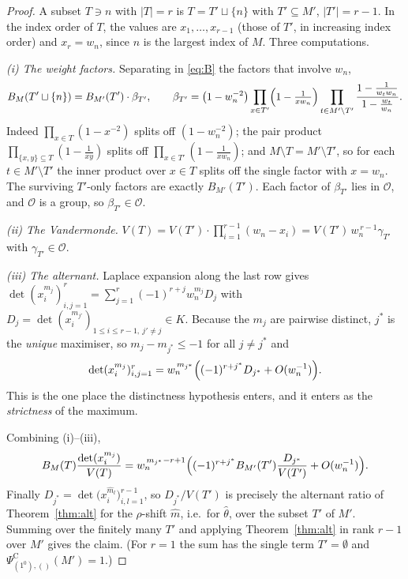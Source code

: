 \documentclass[11pt]{article}
\theoremstyle{definition}
\newcommand{\PsiC}{\Psi^{\mathrm{C}}}
\begin{document}
\begin{proof}
A subset $T\ni n$ with $|T|=r$ is $T=T'\sqcup\{n\}$ with $T'\subseteq M'$, $|T'|=r-1$. In
the index order of $T$, the values are $x_1,\dots,x_{r-1}$ (those of $T'$, in increasing
index order) and $x_r=w_n$, since $n$ is the largest index of $M$. Three computations.

\emph{(i) The weight factors.} Separating in \eqref{eq:B} the factors that involve $w_n$,
\[
  B_M(T'\sqcup\{n\})=B_{M'}(T')\cdot\beta_{T'},\qquad
  \beta_{T'}=\bigl(1-w_n^{-2}\bigr)\prod_{x\in T'}\Bigl(1-\tfrac{1}{xw_n}\Bigr)
  \prod_{t\in M'\setminus T'}\frac{1-\frac{1}{w_tw_n}}{1-\frac{w_t}{w_n}} .
\]
Indeed $\prod_{x\in T}(1-x^{-2})$ splits off $(1-w_n^{-2})$; the pair product
$\prod_{\{x,y\}\subseteq T}(1-\frac{1}{xy})$ splits off
$\prod_{x\in T'}(1-\frac{1}{xw_n})$; and $M\setminus T=M'\setminus T'$, so for each
$t\in M'\setminus T'$ the inner product over $x\in T$ splits off the single factor with
$x=w_n$. The surviving $T'$-only factors are exactly $B_{M'}(T')$. Each factor of
$\beta_{T'}$ lies in $\mathcal{O}$, and $\mathcal{O}$ is a group, so
$\beta_{T'}\in\mathcal{O}$.

\emph{(ii) The Vandermonde.} $V(T)=V(T')\cdot\prod_{i=1}^{r-1}(w_n-x_i)
= V(T')\,w_n^{\,r-1}\gamma_{T'}$ with $\gamma_{T'}\in\mathcal{O}$.

\emph{(iii) The alternant.} Laplace expansion along the last row gives
$\det(x_i^{m_j})_{i,j=1}^{r}=\sum_{j=1}^{r}(-1)^{r+j}w_n^{m_j}D_j$ with
$D_j=\det(x_i^{m_{j'}})_{1\le i\le r-1,\ j'\ne j}\in K$. Because the $m_j$ are pairwise
distinct, $j^\ast$ is the \emph{unique} maximiser, so $m_j-m_{j^\ast}\le-1$ for all
$j\ne j^\ast$ and
\[
  \det(x_i^{m_j})_{i,j=1}^{r}
  = w_n^{\,m_{j^\ast}}\Bigl((-1)^{r+j^\ast}D_{j^\ast}+O(w_n^{-1})\Bigr).
\]
This is the one place the distinctness hypothesis enters, and it enters as the
\emph{strictness} of the maximum.

Combining (i)--(iii),
\[
  B_M(T)\frac{\det(x_i^{m_j})}{V(T)}
  = w_n^{\,m_{j^\ast}-r+1}
    \Bigl((-1)^{r+j^\ast}B_{M'}(T')\frac{D_{j^\ast}}{V(T')}+O(w_n^{-1})\Bigr).
\]
Finally $D_{j^\ast}=\det\bigl(x_i^{\hat m_l}\bigr)_{i,l=1}^{r-1}$, so
$D_{j^\ast}/V(T')$ is precisely the alternant ratio of Theorem~\ref{thm:alt} for the
$\rho$-shift $\hat m$, i.e.\ for $\hat\theta$, over the subset $T'$ of $M'$. Summing over
the finitely many $T'$ and applying Theorem~\ref{thm:alt} in rank $r-1$ over $M'$ gives the
claim. (For $r=1$ the sum has the single term $T'=\emptyset$ and
$\PsiC_{(1^0),()}(M')=1$.)
\end{proof}
\end{document}
